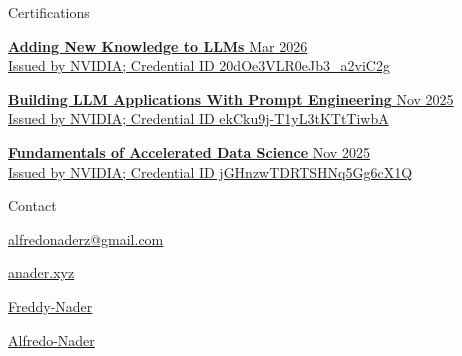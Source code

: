 \documentclass{resume} %
\makeatletter
\newcommand{\email}{alfredonaderz@gmail.com}
\makeatother
\begin{document}
\begin{rSection}{ Certifications }

\href{https://learn.nvidia.com/certificates?id=20dOe3VLR0eJb3_a2viC2g}{%
    {\bf{Adding New Knowledge to LLMs}} \hfill{Mar 2026}
    \\
    Issued by NVIDIA; Credential ID 20dOe3VLR0eJb3\_a2viC2g
}

\href{https://learn.nvidia.com/certificates?id=ekCku9j-T1yL3tKTtTiwbA}{%
    {\bf{Building LLM Applications With Prompt Engineering}} \hfill{Nov 2025}
    \\
    Issued by NVIDIA; Credential ID ekCku9j-T1yL3tKTtTiwbA
}

\href{https://learn.nvidia.com/certificates?id=jGHnzwTDRTSHNq5Gg6cX1Q}{%
    {\bf{Fundamentals of Accelerated Data Science}} \hfill{Nov 2025}
    \\
    Issued by NVIDIA; Credential ID jGHnzwTDRTSHNq5Gg6cX1Q
}

\end{rSection}


\begin{rSection}{ Contact }

\href{mailto:\email}{\faEnvelope\quad\email}

\href{tel:+525525307307}{\faPhone{}}

\href{tel:+4915567218118}{\faPhone{}}

\href{https://www.anader.xyz}{\faEarthAmericas\quad\0anader.xyz}

\href{https://github.com/Freddy-Nader}{\faGithub\quad\0Freddy-Nader}

\href{https://www.linkedin.com/in/alfredo-nader/}{\faLinkedin\quad\0Alfredo-Nader}

\end{rSection}
\end{document}
